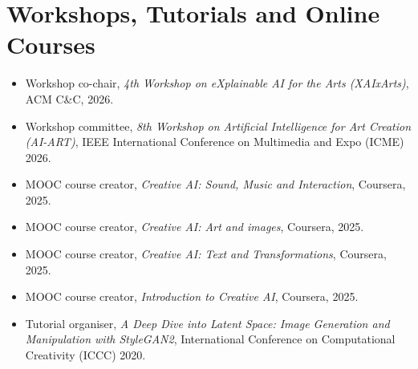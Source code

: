\documentclass[letterpaper,11pt]{article}
\newcommand{\resumeItem}[2]{
  \item\small{
    \textbf{#1}{ #2 \vspace{-2pt}}
  }
}
\newcommand{\resumeSubItem}[2]{\resumeItem{#1}{#2}\vspace{-4pt}}
\newcommand{\resumeSubHeadingListStart}{\begin{itemize}[leftmargin=*]}
\newcommand{\resumeSubHeadingListEnd}{\end{itemize}}
\begin{document}
\section{Workshops, Tutorials and Online Courses}
\resumeSubHeadingListStart
 \resumeSubItem{}{Workshop co-chair, \textit{4th Workshop on eXplainable AI for the Arts (XAIxArts)}, ACM C\&C, 2026.}
 \resumeSubItem{}{Workshop committee, \textit{8th Workshop on
Artificial Intelligence for Art Creation (AI-ART)}, IEEE International Conference on Multimedia and Expo (ICME) 2026.}
\resumeSubItem{}{MOOC course creator, \textit{Creative AI: Sound, Music and Interaction}, Coursera, 2025.}
\resumeSubItem{}{MOOC course creator, \textit{Creative AI: Art and images}, Coursera, 2025.}
\resumeSubItem{}{MOOC course creator, \textit{Creative AI: Text and Transformations}, Coursera, 2025.}
 \resumeSubItem{}{MOOC course creator, \textit{Introduction to Creative AI}, Coursera, 2025.}
 \resumeSubItem{}{Tutorial organiser, \textit{A Deep Dive into Latent Space: Image Generation and Manipulation with StyleGAN2}, International Conference on Computational Creativity (ICCC) 2020.}
\resumeSubHeadingListEnd

\end{document}
